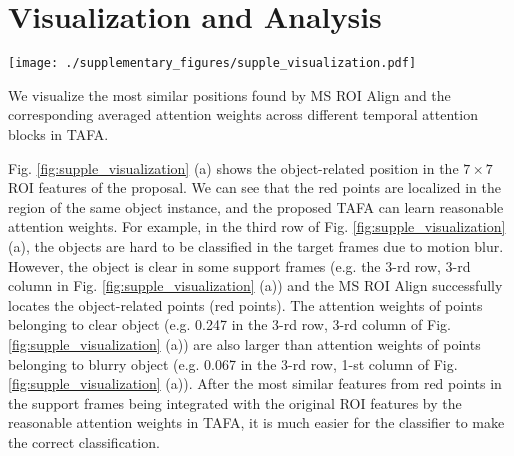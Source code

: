 \documentclass[letterpaper]{article} \usepackage{aaai21}  \usepackage{times}  \usepackage{helvet} \usepackage{courier}  \usepackage[hyphens]{url}  \usepackage{graphicx} \usepackage{hyperref}
\begin{document}
 \section{Visualization and Analysis}
\begin{figure*}
\centering
\texttt{[image: ./supplementary\_figures/supple\_visualization.pdf]}
\caption{An illustration of the most similar positions found by MS ROI Align and the corresponding averaged attention weights across different temporal attention blocks in TAFA (zoom in for a better view). The support frames $T$ is set to 4 during inference for visualization. The first column is the target frames and other columns are support frames. The dash green box is a proposal in target frames.
The solid green box is the region projected into the target frame from the object-related position (a) or background-related position (b) in the $7\times 7$ ROI features of the proposal. The red points in support frames are the most similar positions corresponding to the object-related position (a) or background-related position (b) of the $7\times 7$ ROI features in target frame. Only the top 1 similar position rather than top 4 similar  positions is visualized for a clear visualization. The floating numbers below each row of images are the averaged attention weights in TAFA corresponding to the object-related position (a) or background-related position (b) in the $7\times 7$ ROI features of the proposal}
\label{fig:supple_visualization}
\end{figure*}

We visualize the most similar positions found by MS ROI Align and the corresponding averaged attention weights across different temporal attention blocks in TAFA.

Fig. \ref{fig:supple_visualization} (a) shows the object-related position in the $7\times 7$ ROI features of the proposal. We can see that the red points are localized in the region of the same object instance, and the proposed TAFA can learn reasonable attention weights. For example, in the third row of Fig. \ref{fig:supple_visualization} (a), the objects are hard to be classified in the target frames due to motion blur. However, the object is clear in some support frames (e.g. the 3-rd row, 3-rd column in Fig. \ref{fig:supple_visualization} (a)) and the MS ROI Align successfully locates the object-related points (red points). The attention weights of points belonging to clear object (e.g. 0.247 in the 3-rd row, 3-rd column of Fig. \ref{fig:supple_visualization} (a)) are also larger than attention weights of points belonging to blurry object (e.g. 0.067 in the 3-rd row, 1-st column of Fig. \ref{fig:supple_visualization} (a)). After the most similar features from red points in the support frames being integrated with the original ROI features by the reasonable attention weights in TAFA, it is much easier for the classifier to make the correct classification.
\end{document}
